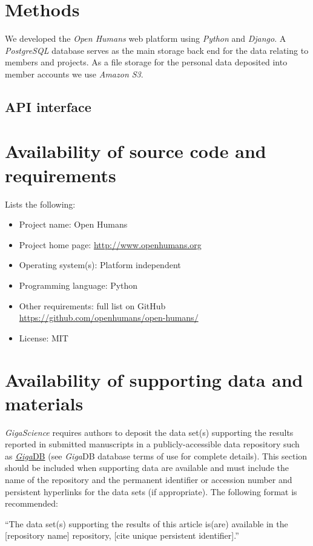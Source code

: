 \documentclass[a4paper,num-refs]{oup-contemporary}
\begin{document}
\section{Methods}

We developed the \textit{Open Humans} web platform using \textit{Python} and \textit{Django}. A \textit{PostgreSQL} database serves as the main storage back end for the data relating to members and projects. As a file storage for the personal data deposited into member accounts we use \textit{Amazon S3}. 

\subsection{API interface}


\section{Availability of source code and requirements}

Lists the following:
\begin{itemize}
\item Project name: Open Humans
\item Project home page: \url{http://www.openhumans.org}
\item Operating system(s): Platform independent
\item Programming language: Python
\item Other requirements: full list on GitHub \url{https://github.com/openhumans/open-humans/}
\item License: MIT
\end{itemize}

\section{Availability of supporting data and materials}

\textit{GigaScience} requires authors to deposit the data set(s) supporting the results reported in submitted manuscripts in a publicly-accessible data repository such as \href{http://gigadb.org/}{\textit{Giga}DB} (see \textit{Giga}DB database terms of use for complete details). This section should be included when supporting data are available and must include the name of the repository and the permanent identifier or accession number and persistent hyperlinks for the data sets (if appropriate). The following format is recommended:

``The data set(s) supporting the results of this article is(are) available in the [repository name] repository, [cite unique persistent identifier].''
\end{document}
